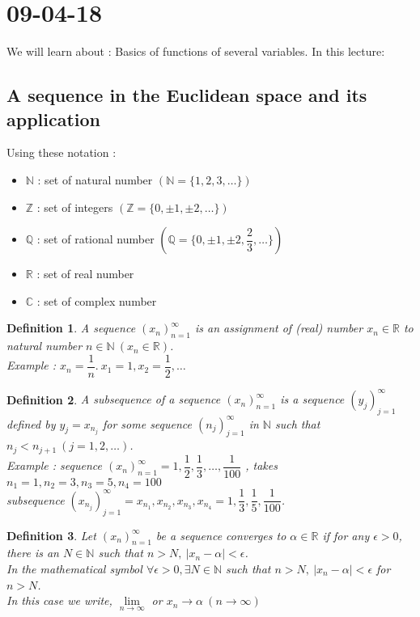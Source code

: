 \documentclass[a4paper,10pt]{article}
\newtheorem{defi}{Definition}
\newcommand{\R}{\mathbb{R}}
\newcommand{\N}{\mathbb{N}}
\newcommand{\Z}{\mathbb{Z}}
\newcommand{\Q}{\mathbb{Q}}
\newcommand{\C}{\mathbb{C}}
\begin{document}
\section{09-04-18}
We will learn about : Basics of functions of several variables.
In this lecture:

\subsection{A sequence in the Euclidean space and its application}
Using these notation :
\begin{itemize}
	\item $ \N $ : set of natural number $ (\N = \{1,2,3, \dots\} )$
	\item $ \Z $ : set of integers $ (\Z = \{0,\pm 1,\pm 2, \dots\} )$
	\item $ \Q $ : set of rational number $ (\Q = \{0,\pm 1, \pm 2, \dfrac{2}{3}, \dots\} )$
	\item $ \R $ : set of real number
	\item $ \C $ : set of complex number
\end{itemize}

\begin{defi}
	A sequence $ (x_{n})_{n=1}^{\infty} $ is an assignment of (real) number $ x_{n} \in \R $ to natural number $ n \in \N \ (x_{n} \in \R)$.\\
	Example : $ x_{n}=\dfrac{1}{n}. \ x_{1}=1,x_{2}=\dfrac{1}{2}, \dots $
\end{defi}

\begin{defi}
	A subsequence of a sequence $ (x_{n})_{n=1}^{\infty} $  is a sequence $ (y_{j})_{j=1}^{\infty} $ defined by $ y_{j}=x_{n_{j}} $ for some sequence $ (n_{j})_{j=1}^{\infty} $ in $ \N $ such that $ n_{j}<n_{j+1} \ (j=1,2,\dots) $.\\
	Example : sequence $ (x_{n})_{n=1}^{\infty} = 1, \dfrac{1}{2} , \dfrac{1}{3}, \dots, \dfrac{1}{100} $ , takes $ n_{1}=1, n_{2}=3, n_{3}=5, n_{4}=100 $\\
	subsequence $ (x_{n_{j}})_{j=1}^{\infty} = x_{n_{1}}, x_{n_{2}}, x_{n_{3}}, x_{n_{4}} = 1, \dfrac{1}{3}, \dfrac{1}{5}, \dfrac{1}{100}$.
\end{defi}

\begin{defi}
	Let $ (x_{n})_{n=1}^{\infty} $ be a sequence converges to $ \alpha \in \R $ if for any $ \epsilon>0 $, there is an $ N \in \N $ such that $ n>N , \ |x_{n}-\alpha|<\epsilon $.\\
	In the mathematical symbol $ \forall \epsilon > 0, \exists N \in \N $ such that $ n>N , \ |x_{n}-\alpha|<\epsilon $ for $ n>N $.\\
	In this case we write, $ \lim\limits_{n \rightarrow \infty} $ or $ x_{n}\rightarrow \alpha \ (n \rightarrow \infty ) $
\end{defi}
\end{document}
